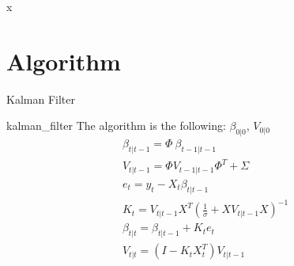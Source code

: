 \message{ !name(kalman_filter.tex)}x\documentclass{article}
\numberwithin{algorithm}{section}
\theoremstyle{plain}
\theoremstyle{definition}
\theoremstyle{remark}
\begin{document}
\appendix
\section{Algorithm}

\begin{algorithm}                      %
\caption{Kalman Filter}          %
\label{alg1}                           %
\begin{algorithmic}[1]
\PROCEDURE kalman\_filter                  %
The algorithm is the following:
\REQUIRE $\beta_{0|0}$, $V_{0|0}$
\begin{eqnarray*}
\beta_{t|t-1} = \Phi \: \beta_{t-1|t-1}\label{p1}\\
V_{t|t-1} = \Phi  V_{t-1|t-1} \Phi ^T + \Sigma \label{p2}\\
e_t = y_t -  X_t \beta_{t|t-1} \label{u1}\\
K_t =  V_{t|t-1} X^T (\frac1\sigma + X V_{t|t-1} X )^{-1}\label{u4}\\
\beta_{t|t} = \beta_{t|t-1} + K_t e_t\label{u2}\\
V_{t|t} = (I - K_t X_t^T) V_{t|t-1}\label{u3}\\
\end{eqnarray*}
\end{algorithmic}
\end{algorithm}
\end{document}
